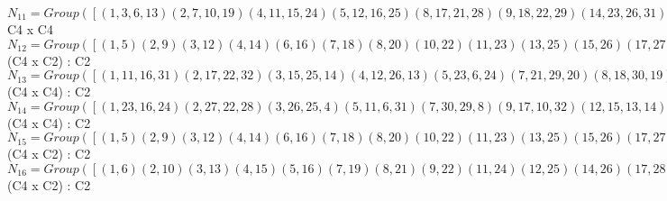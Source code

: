 \documentclass[varwidth=\maxdimen,border=10]{standalone}
\begin{document}
\begin{tabular}
$N_{11} = Group( [ ( 1, 3, 6,13)( 2, 7,10,19)( 4,11,15,24)( 5,12,16,25)( 8,17,21,28)( 9,18,22,29)(14,23,26,31)(20,27,30,32), ( 1, 6)( 2,10)( 3,13)( 4,15)( 5,16)( 7,19)( 8,21)( 9,22)(11,24)(12,25)(14,26)(17,28)(18,29)(20,30)(23,31)(27,32), ( 1, 4, 5,14)( 2, 8, 9,20)( 3,11,12,23)( 6,15,16,26)( 7,17,18,27)(10,21,22,30)(13,24,25,31)(19,28,29,32) ] )\cong$ C4 x C4\ \\
$N_{12} = Group( [ ( 1, 5)( 2, 9)( 3,12)( 4,14)( 6,16)( 7,18)( 8,20)(10,22)(11,23)(13,25)(15,26)(17,27)(19,29)(21,30)(24,31)(28,32), ( 1,32)( 2,31)( 3, 8)( 4, 7)( 5,28)( 6,27)( 9,24)(10,23)(11,22)(12,20)(13,21)(14,18)(15,19)(16,17)(25,30)(26,29), ( 1, 3, 6,13)( 2, 7,10,19)( 4,11,15,24)( 5,12,16,25)( 8,17,21,28)( 9,18,22,29)(14,23,26,31)(20,27,30,32) ] )\cong$ (C4 x C2) : C2\ \\
$N_{13} = Group( [ ( 1,11,16,31)( 2,17,22,32)( 3,15,25,14)( 4,12,26,13)( 5,23, 6,24)( 7,21,29,20)( 8,18,30,19)( 9,27,10,28), ( 1,16)( 2,22)( 3,25)( 4,26)( 5, 6)( 7,29)( 8,30)( 9,10)(11,31)(12,13)(14,15)(17,32)(18,19)(20,21)(23,24)(27,28), ( 1, 2)( 3,18)( 4,21)( 5, 9)( 6,10)( 7,12)( 8,15)(11,32)(13,29)(14,30)(16,22)(17,31)(19,25)(20,26)(23,28)(24,27), ( 1, 3, 6,13)( 2, 7,10,19)( 4,11,15,24)( 5,12,16,25)( 8,17,21,28)( 9,18,22,29)(14,23,26,31)(20,27,30,32) ] )\cong$ (C4 x C4) : C2\ \\
$N_{14} = Group( [ ( 1,23,16,24)( 2,27,22,28)( 3,26,25, 4)( 5,11, 6,31)( 7,30,29, 8)( 9,17,10,32)(12,15,13,14)(18,21,19,20), ( 1,16)( 2,22)( 3,25)( 4,26)( 5, 6)( 7,29)( 8,30)( 9,10)(11,31)(12,13)(14,15)(17,32)(18,19)(20,21)(23,24)(27,28), ( 1, 2)( 3,18)( 4,21)( 5, 9)( 6,10)( 7,12)( 8,15)(11,32)(13,29)(14,30)(16,22)(17,31)(19,25)(20,26)(23,28)(24,27), ( 1, 3, 6,13)( 2, 7,10,19)( 4,11,15,24)( 5,12,16,25)( 8,17,21,28)( 9,18,22,29)(14,23,26,31)(20,27,30,32) ] )\cong$ (C4 x C4) : C2\ \\
$N_{15} = Group( [ ( 1, 5)( 2, 9)( 3,12)( 4,14)( 6,16)( 7,18)( 8,20)(10,22)(11,23)(13,25)(15,26)(17,27)(19,29)(21,30)(24,31)(28,32), ( 1, 2)( 3,18)( 4,21)( 5, 9)( 6,10)( 7,12)( 8,15)(11,32)(13,29)(14,30)(16,22)(17,31)(19,25)(20,26)(23,28)(24,27), ( 1, 3, 6,13)( 2, 7,10,19)( 4,11,15,24)( 5,12,16,25)( 8,17,21,28)( 9,18,22,29)(14,23,26,31)(20,27,30,32) ] )\cong$ (C4 x C2) : C2\ \\
$N_{16} = Group( [ ( 1, 6)( 2,10)( 3,13)( 4,15)( 5,16)( 7,19)( 8,21)( 9,22)(11,24)(12,25)(14,26)(17,28)(18,29)(20,30)(23,31)(27,32), ( 1, 2)( 3,18)( 4,21)( 5, 9)( 6,10)( 7,12)( 8,15)(11,32)(13,29)(14,30)(16,22)(17,31)(19,25)(20,26)(23,28)(24,27), ( 1, 4, 5,14)( 2, 8, 9,20)( 3,11,12,23)( 6,15,16,26)( 7,17,18,27)(10,21,22,30)(13,24,25,31)(19,28,29,32) ] )\cong$ (C4 x C2) : C2\ \\

\end{tabular}
\end{document}
